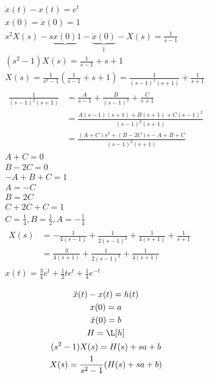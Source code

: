 \begin{bsp*}
	\begin{gather*}
		\ddot{x}(t) - x(t) = e^t \\
		x(0) = \dot{x}(0) = 1 \\
		s^2 X(s) - s \underbrace{x(0)}{1} - \underbrace{\dot{x}(0)}_{1} - X(s) = \frac{1}{s-1} \\
		(s^2 - 1) X(s) = \frac{1}{s-1} + s + 1 \\
		X(s) = \frac{1}{s^2 - 1} \left( \frac{1}{s - 1} + s + 1 \right) = \frac{1}{(s-1)^2 (s+1)} + \frac{1}{s+1} \\
		\begin{split}
			\frac{1}{(s-1)^2 (s+1)}
				&= \frac{A}{s-1} + \frac{B}{(s-1)^2} + \frac{C}{s+1} \\
				&= \frac{A(s-1)(s+1) + B(s+1) + C(s-1)^2}{(s-1)^2 (s+1)} \\
				&= \frac{(A+C)s^2 + (B-2C)s - A + B + C}{(s-1)^2 (s+1)}
		\end{split} \\
		A + C = 0 \\
		B - 2C = 0 \\
		-A + B + C = 1  \\
		A = -C \\
		B = 2C \\ 
		C + 2C + C = 1 \\
		C = \frac{1}{4} , B = \frac{1}{2} , A = -\frac{1}{4} \\
		\begin{split}
			X(s)
				&= -\frac{1}{4(s-1)} + \frac{1}{2(s-1)^2} + \frac{1}{4(s+1)} + \frac{1}{s+1} \\
				&= \frac{3}{4(s+1)} + \frac{1}{2(s-1)^2} + \frac{1}{4(s+1)}
		\end{split} \\
		x(t) = \frac{3}{4} e^t + \frac{1}{2} t e^t + \frac{1}{4} e^{-t}
	\end{gather*}
\end{bsp*}
\begin{bsp*}
	\begin{gather*}
		\ddot{x}(t) - x(t) = h(t) \\
		x(0) = a \\
		\dot{x}(0) = b \\
		H = \L[h] \\
		(s^2 - 1) X(s) = H(s) + sa + b \\
		X(s) = \frac{1}{s^2 - 1} ( H(s) + sa + b )
	\end{gather*}
\end{bsp*}
